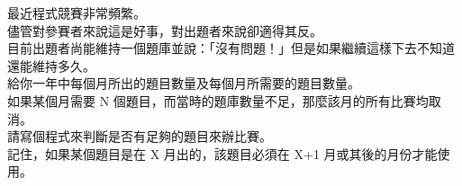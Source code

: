最近程式競賽非常頻繁。\\
儘管對參賽者來說這是好事，對出題者來說卻適得其反。\\
目前出題者尚能維持一個題庫並說：「沒有問題！」但是如果繼續這樣下去不知道還能維持多久。\\
給你一年中每個月所出的題目數量及每個月所需要的題目數量。\\
如果某個月需要 N 個題目，而當時的題庫數量不足，那麼該月的所有比賽均取消。\\
請寫個程式來判斷是否有足夠的題目來辦比賽。\\
記住，如果某個題目是在 X 月出的，該題目必須在 X+1 月或其後的月份才能使用。\\
